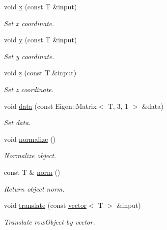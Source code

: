 \begin{DoxyCompactItemize}
void \hyperlink{classddd_1_1point_a8da037dcca8283397e5b56e0dda9aea9}{x} (const T \&input)
\begin{DoxyCompactList}\small\item\em Set x coordinate. \end{DoxyCompactList}\item 
void \hyperlink{classddd_1_1point_a1e82b3a003d07248a7e1c8bc83ad0a58}{y} (const T \&input)
\begin{DoxyCompactList}\small\item\em Set y coordinate. \end{DoxyCompactList}\item 
void \hyperlink{classddd_1_1point_a590cfe75da0948d3b7ef19cf8324f001}{z} (const T \&input)
\begin{DoxyCompactList}\small\item\em Set z coordinate. \end{DoxyCompactList}\item 
void \hyperlink{classddd_1_1point_a8bc0f2072cb816a9a4128220fb4438af}{data} (const Eigen\+::\+Matrix$<$ T, 3, 1 $>$ \&data)
\begin{DoxyCompactList}\small\item\em Set data. \end{DoxyCompactList}\item 
\mbox{\label{classddd_1_1point_ab1d35fc412c7e2f1661cb34f1cc2c250}} 
void \hyperlink{classddd_1_1point_ab1d35fc412c7e2f1661cb34f1cc2c250}{normalize} ()
\begin{DoxyCompactList}\small\item\em Normalize object. \end{DoxyCompactList}\item 
\mbox{\label{classddd_1_1point_a15578d50d54c7d2e56a2a77f39c774a8}} 
const T \& \hyperlink{classddd_1_1point_a15578d50d54c7d2e56a2a77f39c774a8}{norm} ()
\begin{DoxyCompactList}\small\item\em Return object norm. \end{DoxyCompactList}\item 
void \hyperlink{classddd_1_1point_a36c06fef72376a058c663dd9632ddcd0}{translate} (const \hyperlink{classddd_1_1vector}{vector}$<$ T $>$ \&input)
\begin{DoxyCompactList}\small\item\em Translate row\+Object by vector. \end{DoxyCompactList}\item 

\end{DoxyCompactItemize}

